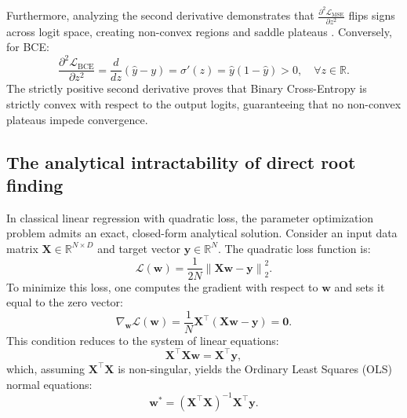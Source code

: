 \documentclass[../../../main.tex]{subfiles}
\begin{document}
Furthermore, analyzing the second derivative demonstrates that $\frac{\partial^2 \mathcal{L}_{\text{MSE}}}{\partial z^2}$ flips signs across logit space, creating non-convex regions and saddle plateaus \citep{goodfellow2016}. Conversely, for BCE:
\begin{equation}
\frac{\partial^2 \mathcal{L}_{\text{BCE}}}{\partial z^2} = \frac{d}{dz}\left(\hat{y} - y\right) = \sigma'(z) = \hat{y}\left(1 - \hat{y}\right) > 0, \quad \forall z \in \mathbb{R}.
\end{equation}
The strictly positive second derivative proves that Binary Cross-Entropy is strictly convex with respect to the output logits, guaranteeing that no non-convex plateaus impede convergence.

\subsection{The analytical intractability of direct root finding}
\label{subsec:intractability_root_finding}

In classical linear regression with quadratic loss, the parameter optimization problem admits an exact, closed-form analytical solution. Consider an input data matrix $\mathbf{X} \in \mathbb{R}^{N \times D}$ and target vector $\mathbf{y} \in \mathbb{R}^N$. The quadratic loss function is:
\begin{equation}
\mathcal{L}(\mathbf{w}) = \frac{1}{2N} \left\| \mathbf{X}\mathbf{w} - \mathbf{y} \right\|_2^2.
\end{equation}
To minimize this loss, one computes the gradient with respect to $\mathbf{w}$ and sets it equal to the zero vector:
\begin{equation}
\nabla_{\mathbf{w}} \mathcal{L}(\mathbf{w}) = \frac{1}{N} \mathbf{X}^\top \left( \mathbf{X}\mathbf{w} - \mathbf{y} \right) = \mathbf{0}.
\end{equation}
This condition reduces to the system of linear equations:
\begin{equation}
\mathbf{X}^\top \mathbf{X}\mathbf{w} = \mathbf{X}^\top \mathbf{y},
\end{equation}
which, assuming $\mathbf{X}^\top \mathbf{X}$ is non-singular, yields the Ordinary Least Squares (OLS) normal equations:
\begin{equation}
\mathbf{w}^* = \left( \mathbf{X}^\top \mathbf{X} \right)^{-1} \mathbf{X}^\top \mathbf{y}.
\end{equation}
\end{document}
